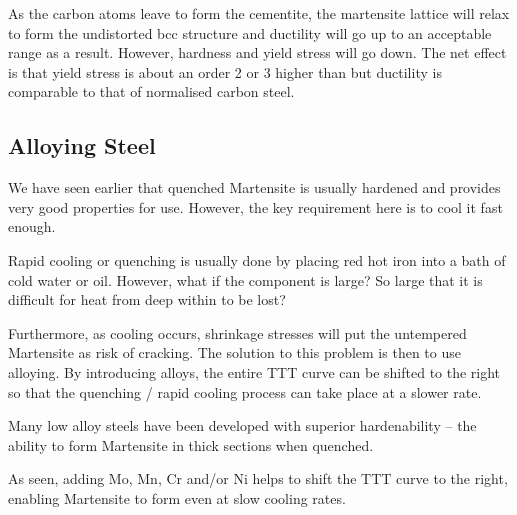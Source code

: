 
As the carbon atoms leave to form the cementite, the martensite lattice will relax to form the undistorted bcc structure and ductility will go up to an acceptable range as a result. However, hardness and yield stress will go down. The net effect is that yield stress is about an order 2 or 3 higher than but ductility is comparable to that of normalised carbon steel.


\subsection{Alloying Steel} %
\label{sub:alloying_steel}


We have seen earlier that quenched Martensite is usually hardened and provides very good properties for use. However, the key requirement here is to cool it fast enough.

Rapid cooling or quenching is usually done by placing red hot iron into a bath of cold water or oil. However, what if the component is large? So large that it is difficult for heat from deep within to be lost?

Furthermore, as cooling occurs, shrinkage stresses will put the untempered Martensite as risk of cracking.
The solution to this problem is then to use alloying. By introducing alloys, the entire TTT curve can be shifted to the right so that the quenching / rapid cooling process can take place at a slower rate.

Many low alloy steels have been developed with superior hardenability – the ability to form Martensite in thick sections when quenched.


As seen, adding Mo, Mn, Cr and/or Ni helps to shift the TTT curve to the right, enabling Martensite to form even at slow cooling rates. 


